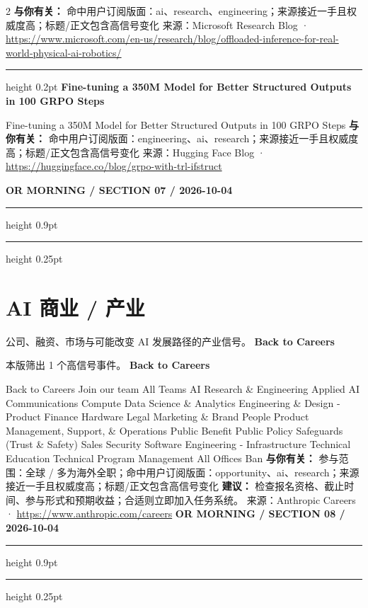\documentclass[10.5pt]{ctexart}
\begin{document}
\begin{multicols}{2}
\textbf{与你有关：} 命中用户订阅版面：ai、research、engineering；来源接近一手且权威度高；标题/正文包含高信号变化
{\footnotesize\color{ormuted} 来源：Microsoft Research Blog · \url{https://www.microsoft.com/en-us/research/blog/offloaded-inference-for-real-world-physical-ai-robotics/}}
\vspace{2mm}
\hrule height 0.2pt
\vspace{2mm}
{\large\bfseries Fine-tuning a 350M Model for Better Structured Outputs in 100 GRPO Steps}\par
Fine-tuning a 350M Model for Better Structured Outputs in 100 GRPO Steps
\textbf{与你有关：} 命中用户订阅版面：engineering、ai、research；来源接近一手且权威度高；标题/正文包含高信号变化
{\footnotesize\color{ormuted} 来源：Hugging Face Blog · \url{https://huggingface.co/blog/grpo-with-trl-ifstruct}}
\end{multicols}
\newpage
{\small\bfseries OR MORNING / SECTION 07 / 2026-10-04}
\vspace{2mm}
\hrule height 0.9pt
\vspace{1.5mm}
\hrule height 0.25pt
\vspace{4mm}
\section*{AI 商业 / 产业}
{\color{ormuted} 公司、融资、市场与可能改变 AI 发展路径的产业信号。}
\vspace{2mm}
{\LARGE\bfseries Back to Careers}\par
\vspace{1mm}
{\color{ormuted} 本版筛出 1 个高信号事件。}
\vspace{3mm}
{\Large\bfseries Back to Careers}\par
Back to Careers Join our team All Teams AI Research \& Engineering Applied AI Communications Compute Data Science \& Analytics Engineering \& Design - Product Finance Hardware Legal Marketing \& Brand People Product Management, Support, \& Operations Public Benefit Public Policy Safeguards (Trust \& Safety) Sales Security Software Engineering - Infrastructure Technical Education Technical Program Management All Offices Ban
\textbf{与你有关：} 参与范围：全球 / 多为海外全职；命中用户订阅版面：opportunity、ai、research；来源接近一手且权威度高；标题/正文包含高信号变化
\textbf{建议：} 检查报名资格、截止时间、参与形式和预期收益；合适则立即加入任务系统。
{\footnotesize\color{ormuted} 来源：Anthropic Careers · \url{https://www.anthropic.com/careers}}
\newpage
{\small\bfseries OR MORNING / SECTION 08 / 2026-10-04}
\vspace{2mm}
\hrule height 0.9pt
\vspace{1.5mm}
\hrule height 0.25pt
\vspace{4mm}
\end{document}
